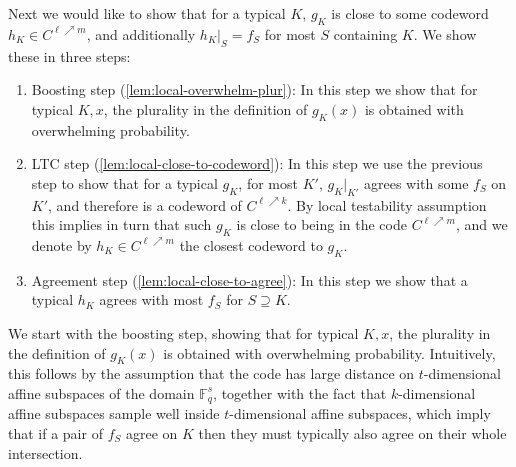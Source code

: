 \documentclass{toc}
\theoremstyle{plain}
\newcommand{\F}{{\mathbb{F}}}
\newcommand{\pl}{{\rm{Plur}}}
\begin{document}
Next we would like to show that for a typical $K$, $g_K$ is close to some codeword $h_K \in C^{\ell \nearrow m}$, and additionally $h_K|_S = f_S$ for most $S$ containing $K$. We show these in three steps:
\begin{enumerate}
  \item Boosting step (\cref{lem:local-overwhelm-plur}): In this step we
show that for typical $K, x$, the plurality in the definition of $g_K(x)$ is obtained with overwhelming probability.
  \item LTC step (\cref{lem:local-close-to-codeword}): In this step we use the previous step to show that for a typical $g_K$,  for most $K'$, $g_K|_{K'}$ agrees with some $f_S$ on $K'$, and therefore is  a codeword of $C^{\ell \nearrow k}$. By local testability assumption this implies in turn that such $g_K$ is close to being in the code $C^{\ell \nearrow m}$, and we denote by $h_K\in C^{\ell \nearrow m}$ the closest codeword to $g_K$.
  \item Agreement step (\cref{lem:local-close-to-agree}): In this step we
  show that a typical $h_K$ agrees with most $f_S$ for $S \supseteq K$.
\end{enumerate}


We start with the boosting step, showing that for typical $K, x$, the plurality in the definition of $g_K(x)$ is obtained with overwhelming probability. Intuitively, this follows  by the assumption that the code 
has large distance %
on $t$-dimensional affine subspaces
of the domain $\F_q^s$,   %
%
together with the fact that $k$-dimensional affine subspaces sample well inside $t$-dimensional affine subspaces, which imply that if a pair of $f_S$ agree on $K$ then they must typically also agree on their whole intersection.

\end{document}
